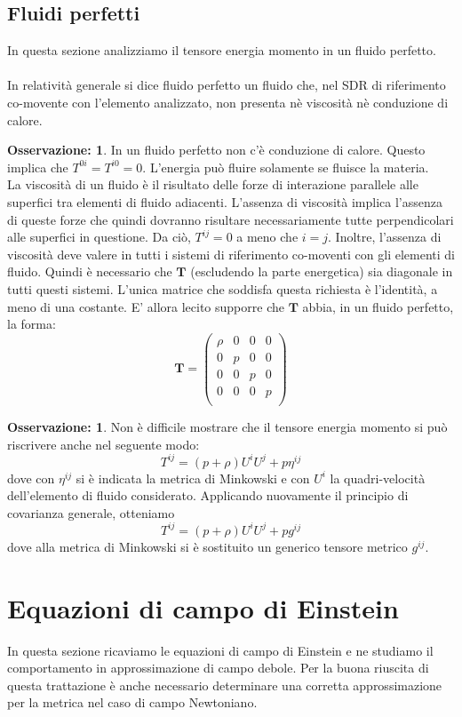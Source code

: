 \documentclass[]{report}
\theoremstyle{definition}
\theoremstyle{Theorem}
\theoremstyle{definition}
\theoremstyle{definition}
\theoremstyle{definition}
\newtheorem{Obs}[Def]{Osservazione:}
\begin{document}
\subsection{Fluidi perfetti}
In questa sezione analizziamo il tensore energia momento in un fluido perfetto.\\
\\
In relatività generale si dice fluido perfetto un fluido che, nel SDR di riferimento co-movente con l'elemento analizzato, non presenta nè viscosità nè conduzione di calore.
\begin{Obs}
	In un fluido perfetto non c'è conduzione di calore. Questo implica che $T^{0i}=T^{i0}=0$. L'energia può fluire solamente se fluisce la materia.\\
	La viscosità di un fluido è il risultato delle forze di interazione parallele alle superfici tra elementi di fluido adiacenti. L'assenza di viscosità implica l'assenza di queste forze che quindi dovranno risultare necessariamente tutte perpendicolari alle superfici in questione. Da ciò, $T^{ij}=0$ a meno che $i=j$.
	Inoltre, l'assenza di viscosità deve valere in tutti i sistemi di riferimento co-moventi con gli elementi di fluido. Quindi è necessario che $\textbf{T}$ (escludendo la parte energetica) sia diagonale in tutti questi sistemi. L'unica matrice che soddisfa questa richiesta è l'identità, a meno di una costante. E' allora lecito supporre che $\textbf{T}$ abbia, in un fluido perfetto, la forma:
	$$\textbf{T}=\begin{pmatrix}
		\rho & 0 & 0 &0\\
		0 & p & 0 &0\\
		0 & 0 & p &0\\
		0 & 0 & 0 &p\\
	\end{pmatrix}$$	
\end{Obs}
\begin{Obs}
	Non è difficile mostrare che il tensore energia momento si può riscrivere anche nel seguente modo:
	$$T^{ij}=(p+\rho)U^iU^j+p\eta^{ij}$$
	dove con $\eta^{ij}$ si è indicata la metrica di Minkowski e con $U^i$ la quadri-velocità dell'elemento di fluido considerato. Applicando nuovamente il principio di covarianza generale, otteniamo
	$$T^{ij}=(p+\rho)U^iU^j+pg^{ij}$$
	dove alla metrica di Minkowski si è sostituito un generico tensore metrico $g^{ij}$.
\end{Obs}
\section{Equazioni di campo di Einstein}
In questa sezione ricaviamo le equazioni di campo di Einstein e ne studiamo il comportamento in approssimazione di campo debole. Per la buona riuscita di questa trattazione è anche necessario determinare una corretta approssimazione per la metrica nel caso di campo Newtoniano.
\end{document}
